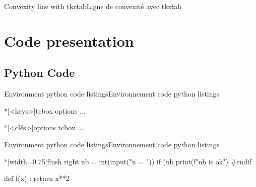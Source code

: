 \documentclass[a4paper,english,11pt]{article}
\begin{document}
\begin{myprestex}{Convexity line with tkztab}{Ligne de convexité avec tkztab}
\end{myprestex}

\newpage

\section{Code presentation}

\subsection{Python Code}

\begin{myprestexcode}{Environment python code listings}{Environnement code python listings}
\begin{pflpythoncodelst}*[<keys>]{tcbox options} ... \end{pflpythoncodelst}
\begin{CodePythonLst}*[<clés>]{options tcbox}   ...  \end{CodePythonLst}

%
\end{myprestexcode}

\begin{myprestex}{Environment python code listings}{Environnement code python listings}
\begin{pflpythoncodelst}*[width=0.75\linewidth]{flush right}
nb = int(input("n = "))
if (nb %
	print(f"{nb} is ok")
#endif

def f(x) :
	return x**2
\end{pflpythoncodelst}
\end{myprestex}
\end{document}
